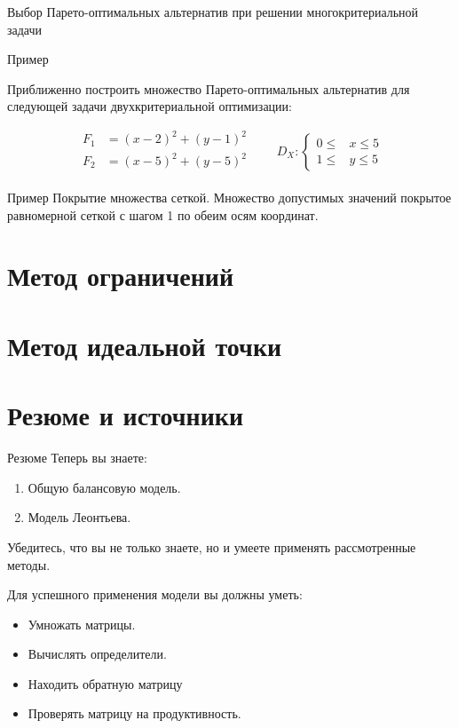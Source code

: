 \documentclass[unicode,11pt,notheorems,xcolor=table]{beamer}
\begin{document}
\begin{frame}{Выбор Парето-оптимальных альтернатив при решении многокритериальной задачи}

\end{frame}

\begin{frame}{Пример}
    \begin{exampleblock}{}
        Приближенно построить множество Парето-оптимальных альтернатив для следующей задачи двухкритериальной оптимизации:
    
    $$  
    \begin{aligned}
        F_1 &= (x-2)^2+(y-1)^2\\
        F_2 &= (x-5)^2+(y-5)^2\\
    \end{aligned}
        \qquad
        D_X\colon 
        \left\lbrace
        \begin{aligned}
            0 \leqslant &x \leqslant 5\\
            1 \leqslant &y \leqslant 5    
        \end{aligned}
        \right.
    $$
\end{exampleblock}
\end{frame}

\begin{frame}{Пример}
    Покрытие множества сеткой.
    Множество допустимых значений покрытое равномерной сеткой с шагом 1 по обеим осям координат.
\end{frame}
\section{Метод ограничений}

\section{Метод идеальной точки}


\section{Резюме и источники}
\begin{frame}{Резюме}
	Теперь вы знаете:
	\begin{enumerate}
	\item 
		Общую балансовую модель.
	\item 
		Модель Леонтьева.
	\end{enumerate}
	Убедитесь, что вы не только знаете, но и умеете применять рассмотренные методы.
	
	Для успешного применения модели вы должны уметь:
	\begin{itemize}
		\item 
			Умножать матрицы.
		\item 
			Вычислять определители.
		\item 
			Находить обратную матрицу
		\item 
			Проверять матрицу на продуктивность.
		\end{itemize}
	
\end{frame}
\end{document}
